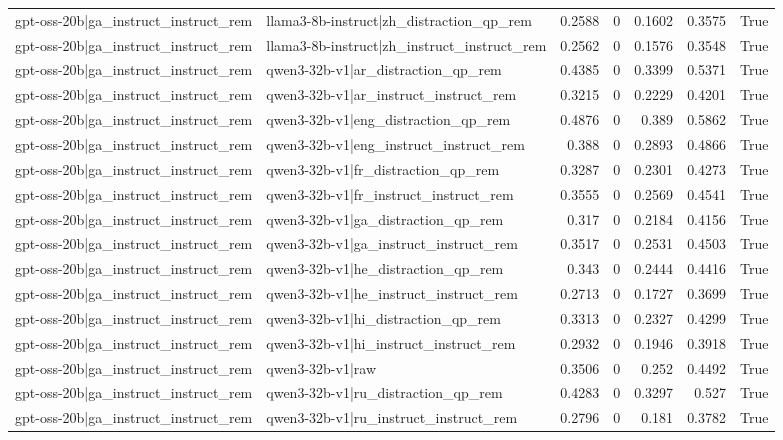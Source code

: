 \begin{table}
\begin{tabular}{l l r r r r l}
gpt-oss-20b|ga_instruct_instruct_rem & llama3-8b-instruct|zh_distraction_qp_rem & 0.2588 & 0 & 0.1602 & 0.3575 & True \\
gpt-oss-20b|ga_instruct_instruct_rem & llama3-8b-instruct|zh_instruct_instruct_rem & 0.2562 & 0 & 0.1576 & 0.3548 & True \\
gpt-oss-20b|ga_instruct_instruct_rem & qwen3-32b-v1|ar_distraction_qp_rem & 0.4385 & 0 & 0.3399 & 0.5371 & True \\
gpt-oss-20b|ga_instruct_instruct_rem & qwen3-32b-v1|ar_instruct_instruct_rem & 0.3215 & 0 & 0.2229 & 0.4201 & True \\
gpt-oss-20b|ga_instruct_instruct_rem & qwen3-32b-v1|eng_distraction_qp_rem & 0.4876 & 0 & 0.389 & 0.5862 & True \\
gpt-oss-20b|ga_instruct_instruct_rem & qwen3-32b-v1|eng_instruct_instruct_rem & 0.388 & 0 & 0.2893 & 0.4866 & True \\
gpt-oss-20b|ga_instruct_instruct_rem & qwen3-32b-v1|fr_distraction_qp_rem & 0.3287 & 0 & 0.2301 & 0.4273 & True \\
gpt-oss-20b|ga_instruct_instruct_rem & qwen3-32b-v1|fr_instruct_instruct_rem & 0.3555 & 0 & 0.2569 & 0.4541 & True \\
gpt-oss-20b|ga_instruct_instruct_rem & qwen3-32b-v1|ga_distraction_qp_rem & 0.317 & 0 & 0.2184 & 0.4156 & True \\
gpt-oss-20b|ga_instruct_instruct_rem & qwen3-32b-v1|ga_instruct_instruct_rem & 0.3517 & 0 & 0.2531 & 0.4503 & True \\
gpt-oss-20b|ga_instruct_instruct_rem & qwen3-32b-v1|he_distraction_qp_rem & 0.343 & 0 & 0.2444 & 0.4416 & True \\
gpt-oss-20b|ga_instruct_instruct_rem & qwen3-32b-v1|he_instruct_instruct_rem & 0.2713 & 0 & 0.1727 & 0.3699 & True \\
gpt-oss-20b|ga_instruct_instruct_rem & qwen3-32b-v1|hi_distraction_qp_rem & 0.3313 & 0 & 0.2327 & 0.4299 & True \\
gpt-oss-20b|ga_instruct_instruct_rem & qwen3-32b-v1|hi_instruct_instruct_rem & 0.2932 & 0 & 0.1946 & 0.3918 & True \\
gpt-oss-20b|ga_instruct_instruct_rem & qwen3-32b-v1|raw & 0.3506 & 0 & 0.252 & 0.4492 & True \\
gpt-oss-20b|ga_instruct_instruct_rem & qwen3-32b-v1|ru_distraction_qp_rem & 0.4283 & 0 & 0.3297 & 0.527 & True \\
gpt-oss-20b|ga_instruct_instruct_rem & qwen3-32b-v1|ru_instruct_instruct_rem & 0.2796 & 0 & 0.181 & 0.3782 & True \\

\end{tabular}
\end{table}
